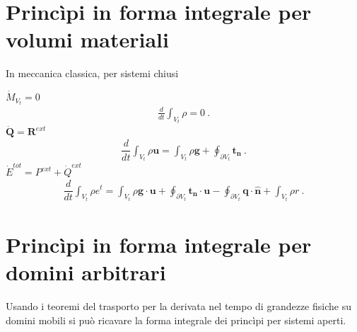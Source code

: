 \documentclass[letterpaper,10pt,english]{jupyterBook}
\begin{document}
\chapter{Princìpi in forma integrale per volumi materiali}
\label{\detokenize{ch/continuum/principles-integral:principi-in-forma-integrale-per-volumi-materiali}}\label{\detokenize{ch/continuum/principles-integral:continuum-principles-integral}}\label{\detokenize{ch/continuum/principles-integral::doc}}
\sphinxAtStartPar
In meccanica classica, per sistemi chiusi

\sphinxAtStartPar
{} \(\dot{M}_{V_t} = 0\)
\begin{equation*}
\begin{split}\frac{d}{dt} \int_{V_t} \rho = 0 \ .\end{split}
\end{equation*}
\sphinxAtStartPar
{} \(\dot{\mathbf{Q}} = \mathbf{R}^{ext}\)
\begin{equation*}
\begin{split}\dfrac{d}{dt} \int_{V_t} \rho \mathbf{u} = \int_{V_t} \rho \mathbf{g} + \oint_{\partial V_t} \mathbf{t}_{\mathbf{n}} \ .\end{split}
\end{equation*}
\sphinxAtStartPar
{} \(\dot{E}^{tot} = P^{ext} + \dot{Q}^{ext}\)
\begin{equation*}
\begin{split}\dfrac{d}{dt} \int_{V_t} \rho e^t = \int_{V_t} \rho \mathbf{g} \cdot \mathbf{u} + \oint_{\partial V_t} \mathbf{t}_{\mathbf{n}} \cdot \mathbf{u} - \oint_{\partial V_t} \mathbf{q} \cdot \mathbf{\hat{n}} + \int_{V_t} \rho r \ .\end{split}
\end{equation*}
\sphinxstepscope


\chapter{Princìpi in forma integrale per domini arbitrari}
\label{\detokenize{ch/continuum/principles-integral-arbitrary:principi-in-forma-integrale-per-domini-arbitrari}}\label{\detokenize{ch/continuum/principles-integral-arbitrary:continuum-principles-integral-arbitrary}}\label{\detokenize{ch/continuum/principles-integral-arbitrary::doc}}
\sphinxAtStartPar
Usando i teoremi del trasporto per la derivata nel tempo di grandezze fisiche su domini mobili   si può ricavare la forma integrale dei princìpi per sistemi aperti.
\end{document}
